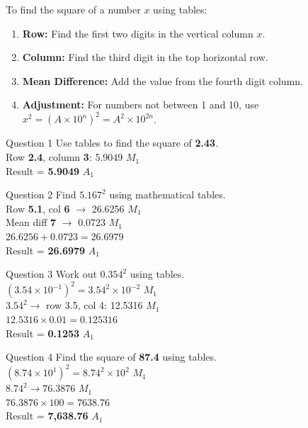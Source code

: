 \documentclass[12pt, a4paper, oneside]{article}
\begin{document}
\begin{tcolorbox}[colback=lightgrey, colframe=primaryblue, title=\textbf{Step-by-Step Table Usage}, arc=5pt]
    To find the square of a number $x$ using tables:
    \begin{enumerate}
        \item \textbf{Row:} Find the first two digits in the vertical column $x$.
        \item \textbf{Column:} Find the third digit in the top horizontal row.
        \item \textbf{Mean Difference:} Add the value from the fourth digit column.
        \item \textbf{Adjustment:} For numbers not between 1 and 10, use $x^2 = (A \times 10^n)^2 = A^2 \times 10^{2n}$.
    \end{enumerate}
\end{tcolorbox}

\begin{solvingbox}{Question 1}
Use tables to find the square of \textbf{2.43}. \\
Row \textbf{2.4}, column \textbf{3}: 5.9049 \hfill $M_1$ \\
Result = \textbf{5.9049} \hfill $A_1$
\end{solvingbox}

\begin{solvingbox}{Question 2}
Find $5.167^2$ using mathematical tables. \\
Row \textbf{5.1}, col \textbf{6} $\rightarrow$ 26.6256 \hfill $M_1$ \\
Mean diff \textbf{7} $\rightarrow$ 0.0723 \hfill $M_1$ \\
$26.6256 + 0.0723 = 26.6979$ \\
Result = \textbf{26.6979} \hfill $A_1$
\end{solvingbox}

\begin{solvingbox}{Question 3}
Work out $0.354^2$ using tables. \\
$(3.54 \times 10^{-1})^2 = 3.54^2 \times 10^{-2}$ \hfill $M_1$ \\
$3.54^2 \rightarrow$ row 3.5, col 4: 12.5316 \hfill $M_1$ \\
$12.5316 \times 0.01 = 0.125316$ \\
Result = \textbf{0.1253} \hfill $A_1$
\end{solvingbox}

\begin{solvingbox}{Question 4}
Find the square of \textbf{87.4} using tables. \\
$(8.74 \times 10^1)^2 = 8.74^2 \times 10^2$ \hfill $M_1$ \\
$8.74^2 \rightarrow 76.3876$ \hfill $M_1$ \\
$76.3876 \times 100 = 7638.76$ \\
Result = \textbf{7,638.76} \hfill $A_1$
\end{solvingbox}
\end{document}
